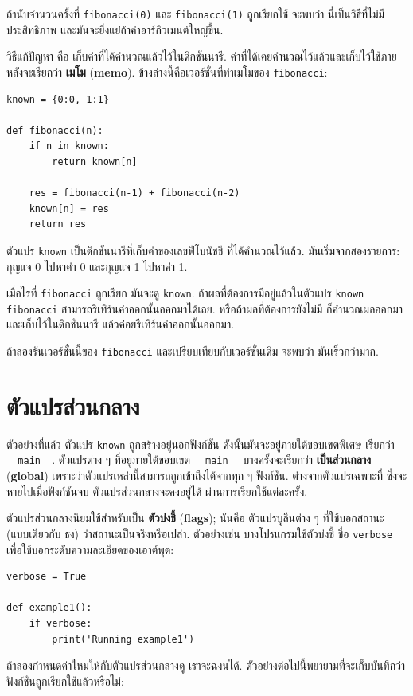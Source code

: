 ถ้านับจำนวนครั้งที่ \texttt{fibonacci(0)} และ \texttt{fibonacci(1)} ถูกเรียกใช้
จะพบว่า นี่เป็นวิธีที่ไม่มีประสิทธิภาพ และมันจะยิ่งแย่ถ้าค่าอาร์กิวเมนต์ใหญ่ขึ้น.

วิธีแก้ปัญหา คือ เก็บค่าที่ได้คำนวณแล้วไว้ในดิกชันนารี.
ค่าที่ได้เคยคำนวณไว้แล้วและเก็บไว้ใช้ภายหลังจะเรียกว่า \textbf{เมโม} (\textbf{memo}).
ข้างล่างนี้คือเวอร์ชั่นที่ทำเมโมของ \texttt{fibonacci}:

\begin{verbatim}
known = {0:0, 1:1}

def fibonacci(n):
    if n in known:
        return known[n]

    res = fibonacci(n-1) + fibonacci(n-2)
    known[n] = res
    return res
\end{verbatim}
%
ตัวแปร \texttt{known} เป็นดิกชันนารีที่เก็บค่าของเลขฟีโบนัชชี ที่ได้คำนวณไว้แล้ว.
มันเริ่มจากสองรายการ: กุญแจ 0 ไปหาค่า 0 และกุญแจ 1 ไปหาค่า 1.

เมื่อไรที่ \texttt{fibonacci} ถูกเรียก
มันจะดู \texttt{known}.
ถ้าผลที่ต้องการมีอยู่แล้วในตัวแปร \texttt{known}
\texttt{fibonacci} สามารถรีเทิร์นค่าออกนั้นออกมาได้เลย.
หรือถ้าผลที่ต้องการยังไม่มี ก็คำนวณผลออกมา และเก็บไว้ในดิกชันนารี แล้วค่อยรีเทิร์นค่าออกนั้นออกมา.

ถ้าลองรันเวอร์ชั่นนี้ของ \texttt{fibonacci} และเปรียบเทียบกับเวอร์ชั่นเดิม
จะพบว่า มันเร็วกว่ามาก.

\section{ตัวแปรส่วนกลาง}

ตัวอย่างที่แล้ว ตัวแปร \texttt{known} ถูกสร้างอยู่นอกฟังก์ชัน
ดังนั้นมันจะอยู่ภายใต้ขอบเขตพิเศษ เรียกว่า \verb"__main__".
ตัวแปรต่าง ๆ ที่อยู่ภายใต้ขอบเขต \verb"__main__" บางครั้งจะเรียกว่า \textbf{เป็นส่วนกลาง} (\textbf{global})
เพราะว่าตัวแปรเหล่านี้สามารถถูกเข้าถึงได้จากทุก ๆ ฟังก์ชัน.
ต่างจากตัวแปรเฉพาะที่ ซึ่งจะหายไปเมื่อฟังก์ชันจบ
ตัวแปรส่วนกลางจะคงอยู่ได้ ผ่านการเรียกใช้แต่ละครั้ง.

ตัวแปรส่วนกลางนิยมใช้สำหรับเป็น \textbf{ตัวบ่งชี้} (\textbf{flags});
นั่นคือ ตัวแปรบูลีนต่าง ๆ ที่ใช้บอกสถานะ (แบบเดียวกับ ธง) ว่าสถานะเป็นจริงหรือเปล่า.
ตัวอย่างเช่น บางโปรแกรมใช้ตัวบ่งชี้ ชื่อ \texttt{verbose} เพื่อใช้บอกระดับความละเอียดของเอาต์พุต:

\begin{verbatim}
verbose = True

def example1():
    if verbose:
        print('Running example1')
\end{verbatim}
%
ถ้าลองกำหนดค่าใหม่ให้กับตัวแปรส่วนกลางดู
เราจะฉงนได้.
ตัวอย่างต่อไปนี้พยายามที่จะเก็บบันทึกว่าฟังก์ชันถูกเรียกใช้แล้วหรือไม่:


